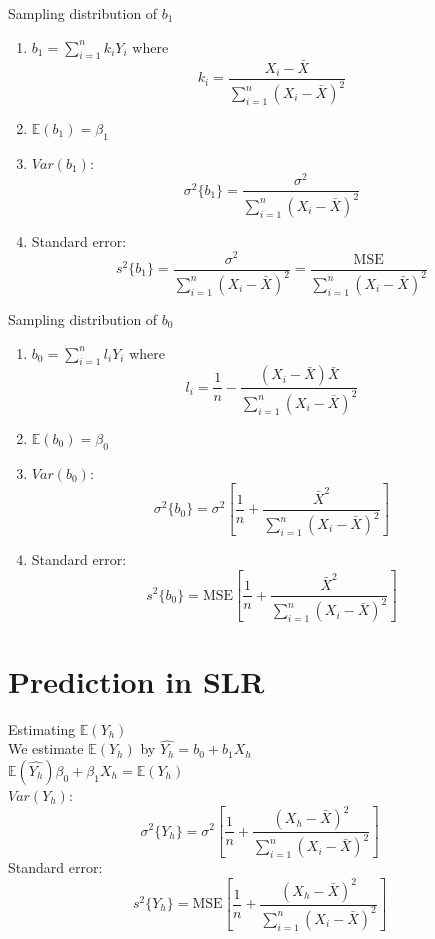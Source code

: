 \documentclass[14pt, oneside, letterpaper, fleqn]{notes}
\begin{document}
\begin{mydef}
Sampling distribution of $b_1$
\begin{enumerate}
\item $b_1 = \sum_{i=1}^n k_iY_i$ where 
\[
k_i = \frac{X_i-\bar{X}}{\sum_{i=1}^n(X_i - \bar{X})^2}
\]

\item $\mathbb{E}(b_1) = \beta_1$

\item $Var(b_1)$:
\[
\sigma^2\{b_1\} = 
\frac{\sigma^2}{\sum_{i=1}^n(X_i - \bar{X})^2}
\]

\item Standard error:
\[
s^2\{b_1\} = \frac{\sigma^2}
{\sum_{i=1}^n(X_i - \bar{X})^2} = 
\frac{\text{MSE}}{\sum_{i=1}^n(X_i - \bar{X})^2}
\]

\end{enumerate}
\end{mydef}

\begin{mydef}
Sampling distribution of $b_0$
\begin{enumerate}
\item $b_0 = \sum_{i=1}^n l_iY_i$ where 
\[
l_i = \frac{1}{n} - 
\frac{(X_i-\bar{X})\bar{X}}
{\sum_{i=1}^n(X_i - \bar{X})^2}
\]

\item $\mathbb{E}(b_0) = \beta_0$

\item $Var(b_0)$:
\[
\sigma^2\{b_0\} = 
\sigma^2 [ \frac{1}{n} + 
\frac{\bar{X}^2}{\sum_{i=1}^n(X_i - \bar{X})^2} ]
\]

\item Standard error:
\[
s^2\{b_0\} =
\text{MSE} [ \frac{1}{n} + 
\frac{\bar{X}^2}{\sum_{i=1}^n(X_i - \bar{X})^2} ]
\]

\end{enumerate}
\end{mydef}

%
%

\section*{Prediction in SLR}
\begin{remark} Estimating $\mathbb{E}(Y_h)$ \\
We estimate $\mathbb{E}(Y_h)$ by $\hat{Y_h} = b_0 + b_1X_h$ \\
$\mathbb{E}(\hat{Y_h})\beta_0 +\beta_1X_h = 
\mathbb{E}(Y_h) $ \\
$Var(Y_h)$:
\[
\sigma^2\{Y_h\} = 
\sigma^2 [ \frac{1}{n} + 
\frac{(X_h - \bar{X})^2}{\sum_{i=1}^n(X_i - \bar{X})^2} ]
\]
Standard error:
\[
s^2\{Y_h\} =
\text{MSE} [ \frac{1}{n} + 
\frac{(X_h - \bar{X})^2}{\sum_{i=1}^n(X_i - \bar{X})^2} ]
\]
\end{remark}
\end{document}
